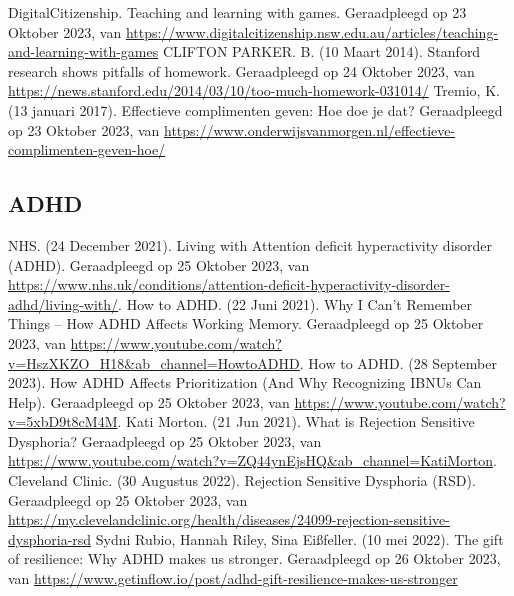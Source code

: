 \documentclass{article}
\begin{document}
\begin{thebibliography}{9}
                DigitalCitizenship. Teaching and learning with games. Geraadpleegd op 23 Oktober 2023, van \url{https://www.digitalcitizenship.nsw.edu.au/articles/teaching-and-learning-with-games}
                CLIFTON PARKER. B. (10 Maart 2014). Stanford research shows pitfalls of homework. Geraadpleegd op 24 Oktober 2023, van \url{https://news.stanford.edu/2014/03/10/too-much-homework-031014/}
                Tremio, K. (13 januari 2017). Effectieve complimenten geven: Hoe doe je dat? Geraadpleegd op 23 Oktober 2023, van \url{https://www.onderwijsvanmorgen.nl/effectieve-complimenten-geven-hoe/}
        \newpage

        \item[\bigskip\subsection*{ADHD}]
                NHS. (24 December 2021). Living with Attention deficit hyperactivity disorder (ADHD). Geraadpleegd op 25 Oktober 2023, van \url{https://www.nhs.uk/conditions/attention-deficit-hyperactivity-disorder-adhd/living-with/}.
                How to ADHD. (22 Juni 2021). Why I Can't Remember Things -- How ADHD Affects Working Memory. Geraadpleegd op 25 Oktober 2023, van \url{https://www.youtube.com/watch?v=HszXKZO_H18&ab_channel=HowtoADHD}.
                How to ADHD. (28 September 2023). How ADHD Affects Prioritization (And Why Recognizing IBNUs Can Help). Geraadpleegd op 25 Oktober 2023, van \url{https://www.youtube.com/watch?v=5xbD9t8cM4M}.
                Kati Morton. (21 Jun 2021). What is Rejection Sensitive Dysphoria? Geraadpleegd op 25 Oktober 2023, van \url{https://www.youtube.com/watch?v=ZQ44ynEjsHQ&ab_channel=KatiMorton}.
                Cleveland Clinic. (30 Augustus 2022). Rejection Sensitive Dysphoria (RSD). Geraadpleegd op 25 Oktober 2023, van \url{https://my.clevelandclinic.org/health/diseases/24099-rejection-sensitive-dysphoria-rsd}
                Sydni Rubio, Hannah Riley, Sina Eißfeller. (10 mei 2022). The gift of resilience: Why ADHD makes us stronger. Geraadpleegd op 26 Oktober 2023, van \url{https://www.getinflow.io/post/adhd-gift-resilience-makes-us-stronger}

\end{thebibliography}
\end{document}
